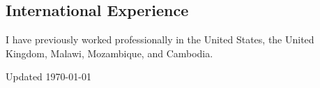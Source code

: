 \documentclass[12pt,letterpaper]{report}
\newcommand{\listitemspace}{0.15em}
\renewenvironment{itemize}
{\begin{list}{}{\setlength{\leftmargin}{0em}
				\setlength{\parskip}{0em}
				\setlength{\itemsep}{\listitemspace}
				\setlength{\parsep}{\listitemspace}}}
{\end{list}}
\begin{document}
\subsection*{International Experience}

\begin{itemize}
	
\item I have previously worked professionally in the United States, the United Kingdom, Malawi, Mozambique, and Cambodia.

\end{itemize}



\begin{center}
\vspace{6em}
Updated \monthyeardate\today
\end{center}
\end{document}
